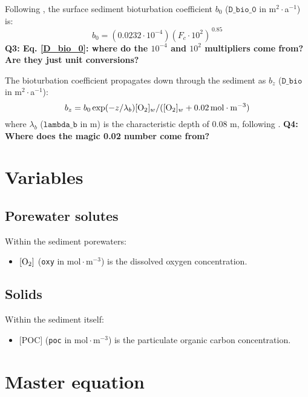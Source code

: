 \documentclass[a4paper]{article}
\newcommand{\code}[1]{\texttt{#1}}
\newcommand{\molmmm}{\mathrm{mol}\cdot\mathrm{m}^{-3}}
\newcommand{\wtf}[1]{\textcolor{Cerulean}{\textbf{#1}}}
\begin{document}
Following \citet{archer_model_2002}, the surface sediment bioturbation coefficient $b_0$ ($\code{D\_bio\_0}$ in m$^2\cdot$a$^{-1}$) is:
\begin{equation}\label{D_bio_0}
b_0 = (0.0232 \cdot 10^{-4}) (F_c \cdot 10^2)^{\,0.85}
\end{equation}
\wtf{Q3: Eq. \eqref{D_bio_0}: where do the $10^{-4}$ and $10^2$ multipliers come from? Are they just unit conversions?}

The bioturbation coefficient propagates down through the sediment as $b_z$ ($\code{D\_bio}$ in m$^2\cdot$a$^{-1}$):
\begin{equation}\label{B_z}
b_z = b_0 \exp(-z/\lambda_b) [\ce{O2}]_w / ([\ce{O2}]_w + 0.02 \, \molmmm)
\end{equation}
where $\lambda_b$ ($\code{lambda\_b}$ in m) is the characteristic depth of 0.08 m, following \citet{sayles_benthic_2001}. \wtf{Q4: Where does the magic 0.02 number come from?}

\section{Variables}

\subsection{Porewater solutes}

Within the sediment porewaters:
\begin{itemize}
  \item $[\ce{O2}]$ (\code{oxy} in $\molmmm$) is the dissolved oxygen concentration.
\end{itemize}

\subsection{Solids}

Within the sediment itself:
\begin{itemize}
  \item $[$POC$]$ (\code{poc} in $\molmmm$) is the particulate organic carbon concentration.
\end{itemize}

\section{Master equation}
\end{document}
